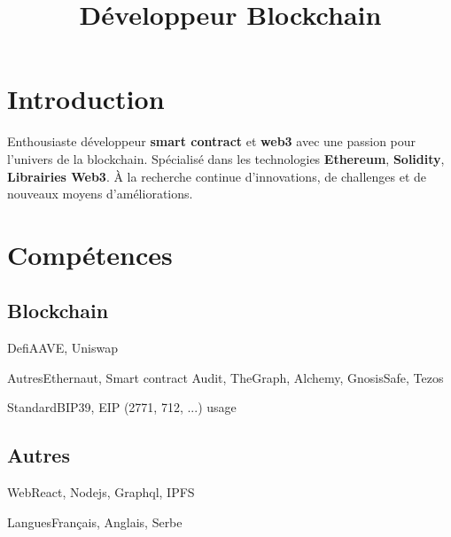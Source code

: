 \documentclass[10pt,a4paper,sans]{moderncv}        %
\title{Développeur Blockchain}                               %
\begin{document}

\makecvtitle
\vspace{-3ex}
\section{Introduction}
{
    Enthousiaste développeur \textbf{smart contract} et \textbf{web3} avec une 
    passion pour l’univers de la blockchain. Spécialisé dans les 
    technologies \textbf{Ethereum}, \textbf{Solidity}, 
    \textbf{Librairies Web3}.
    À la recherche continue d’innovations, de challenges et de nouveaux moyens 
    d’améliorations.
}
\vspace{2ex}
\section{Compétences}
\vspace{0.5ex}
\subsection{Blockchain}
{\textcolor{color2}{Defi}}{AAVE, Uniswap}{}

{\textcolor{color2}{Autres}}{Ethernaut, Smart contract Audit, TheGraph, Alchemy, GnosisSafe, Tezos}{}

{\textcolor{color2}{Standard}}{BIP39, EIP (2771, 712, ...) usage}{}

\vspace{1ex}
\subsection{Autres}

{\textcolor{color2}{Web}}{React, Nodejs, Graphql, IPFS}{}

{\textcolor{color2}{Langues}}{Français, Anglais, Serbe}{}

\vspace{2ex}
\end{document}
